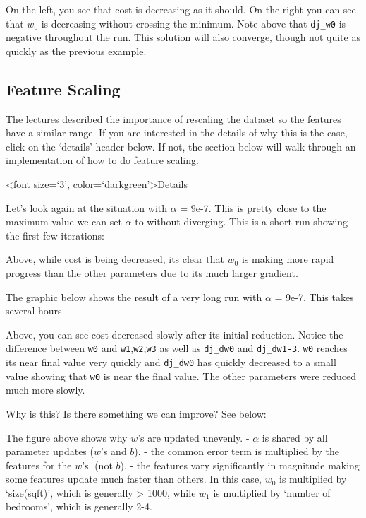 \documentclass[11pt]{article}
\begin{document}
    On the left, you see that cost is decreasing as it should. On the right
you can see that \(w_0\) is decreasing without crossing the minimum.
Note above that \texttt{dj\_w0} is negative throughout the run. This
solution will also converge, though not quite as quickly as the previous
example.

    \hypertarget{feature-scaling}{%
\subsection{Feature Scaling}\label{feature-scaling}}

The lectures described the importance of rescaling the dataset so the
features have a similar range. If you are interested in the details of
why this is the case, click on the `details' header below. If not, the
section below will walk through an implementation of how to do feature
scaling.

    \textless font size=`3', color=`darkgreen'\textgreater{}Details

Let's look again at the situation with \(\alpha\) = 9e-7. This is pretty
close to the maximum value we can set \(\alpha\) to without diverging.
This is a short run showing the first few iterations:

Above, while cost is being decreased, its clear that \(w_0\) is making
more rapid progress than the other parameters due to its much larger
gradient.

The graphic below shows the result of a very long run with \(\alpha\) =
9e-7. This takes several hours.

Above, you can see cost decreased slowly after its initial reduction.
Notice the difference between \texttt{w0} and
\texttt{w1},\texttt{w2},\texttt{w3} as well as \texttt{dj\_dw0} and
\texttt{dj\_dw1-3}. \texttt{w0} reaches its near final value very
quickly and \texttt{dj\_dw0} has quickly decreased to a small value
showing that \texttt{w0} is near the final value. The other parameters
were reduced much more slowly.

Why is this? Is there something we can improve? See below:

The figure above shows why \(w\)'s are updated unevenly. - \(\alpha\) is
shared by all parameter updates (\(w\)'s and \(b\)). - the common error
term is multiplied by the features for the \(w\)'s. (not \(b\)). - the
features vary significantly in magnitude making some features update
much faster than others. In this case, \(w_0\) is multiplied by
`size(sqft)', which is generally \textgreater{} 1000, while \(w_1\) is
multiplied by `number of bedrooms', which is generally 2-4.
\end{document}
